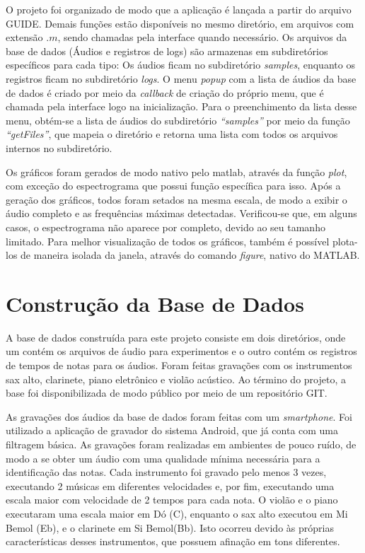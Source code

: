 O projeto foi organizado de modo que a aplicação é lançada a partir do arquivo GUIDE. Demais funções estão disponíveis no mesmo diretório, em arquivos com extensão $.m$, sendo chamadas pela interface quando necessário. Os arquivos da base de dados (Áudios e registros de logs) são armazenas em subdiretórios específicos para cada tipo: Os áudios ficam no subdiretório \textit{samples}, enquanto os registros ficam no subdiretório \textit{logs}. O menu \textit{popup} com a lista de áudios da base de dados é criado por meio da \textit{callback} de criação do próprio menu, que é chamada pela interface logo na inicialização. Para o preenchimento da lista desse menu, obtém-se a lista de áudios do subdiretório \textit{``samples''} por meio da função \textit{``getFiles''}, que mapeia o diretório e retorna uma lista com todos os arquivos internos no subdiretório.


Os gráficos foram gerados de modo nativo pelo matlab, através da função \textit{plot}, com exceção do espectrograma que possui função específica para isso. Após a geração dos gráficos, todos foram setados na mesma escala, de modo a exibir o áudio completo e as frequências máximas detectadas. Verificou-se que, em alguns casos, o espectrograma não aparece por completo, devido ao seu tamanho limitado. Para melhor visualização de todos os gráficos, também é possível plota-los de maneira isolada da janela, através do comando \textit{figure}, nativo do MATLAB\rreg.



\section{Construção da Base de Dados}

A base de dados construída para este projeto consiste em dois diretórios, onde um contém os arquivos de áudio para experimentos e o outro contém os registros de tempos de notas para os áudios. Foram feitas gravações com os instrumentos sax alto, clarinete, piano eletrônico e violão acústico. Ao término do projeto, a base foi disponibilizada de modo público por meio de um repositório GIT\cite{cruzjr2018}.


As gravações dos áudios da base de dados foram feitas com um \textit{smartphone}. Foi utilizado a aplicação de gravador do sistema Android\rreg, que já conta com uma filtragem básica. As gravações foram realizadas em ambientes de pouco ruído, de modo a se obter um áudio com uma qualidade mínima necessária para a identificação das notas. Cada instrumento foi gravado pelo menos 3 vezes, executando 2 músicas em diferentes velocidades e, por fim, executando uma escala maior com velocidade de 2 tempos para cada nota. O violão e o piano executaram uma escala maior em Dó (C), enquanto o sax alto executou em Mi Bemol (Eb), e o clarinete em Si Bemol(Bb). Isto ocorreu devido às próprias características desses instrumentos, que possuem afinação em tons diferentes.

